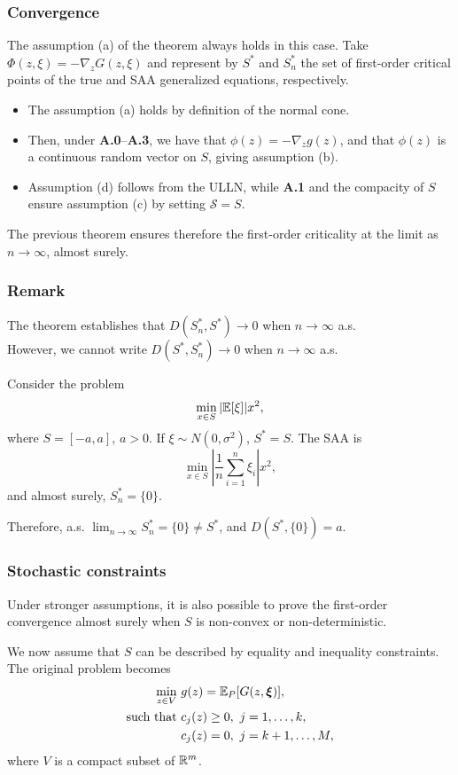 \documentclass{beamer}
\begin{document}
\begin{frame}
\frametitle{Convergence}

The assumption (a) of the theorem always holds in this case.
Take $\Phi(z,\xi) = -\nabla_z G(z, \xi)$ and represent by $S^*$ and $S^*_n$ the set of first-order critical points of the true and SAA generalized equations, respectively.

\begin{itemize}
\item
The assumption (a) holds by definition of the normal cone.
\item
Then, under \textbf{A.0}--\textbf{A.3}, we have that $\phi(z) = -\nabla_z
g(z)$, and that $\phi(z)$ is a continuous random vector on $S$, giving assumption (b).
\item
Assumption (d) follows from the ULLN, while \textbf{A.1} and the compacity of $S$ ensure assumption (c) by setting $\mathcal{S} = S$. 
\end{itemize}

The previous theorem ensures therefore the first-order criticality at the limit as $n\rightarrow\infty$, almost surely.

\end{frame}

\begin{frame}
\frametitle{Remark}

The theorem establishes that $D(S_n^*, S^*) \rightarrow 0$ when $n \rightarrow \infty$ a.s.\\
However, we cannot write $D(S^*, S_n^*) \rightarrow 0$ when $n \rightarrow \infty$ a.s.

\mbox{}

Consider the problem
$$
\min_{x \in S} |{\mathbb{E}}[\xi]| x^2,
$$
where $S = [-a,a]$, $a > 0$. If $\xi \sim N(0, \sigma^2)$, $S^* = S$.
The SAA is
$$
\min_{x \in S} \left|\frac{1}{n} \sum_{i=1}^n \xi_i\right| x^2,
$$
and almost surely, $S^*_n = \{ 0 \}$.

Therefore, a.s. $\lim_{n \rightarrow \infty} S^*_n = \{ 0 \} \ne S^*$, and $D(S^*, \{0\}) = a$.

\end{frame}

\begin{frame}
\frametitle{Stochastic constraints}

Under stronger assumptions, it is also possible to prove the first-order convergence almost surely when $S$ is non-convex or non-deterministic.

\mbox{}

We now assume that $S$ can be described by equality and inequality constraints.
The original problem becomes
\begin{align*}
\min_{z \in V}\ & g(z) = {\mathbb{E}}_P[G(z, \boldsymbol{\xi})],\\
\text{such that } & c_j(z) \geq 0,\ j = 1,\ldots,k,\\
& c_j(z) = 0,\ j = k+1,\ldots, M,
\end{align*}
where $V$ is a compact subset of $\mathbb{R}^m$.

\end{frame}
\end{document}
